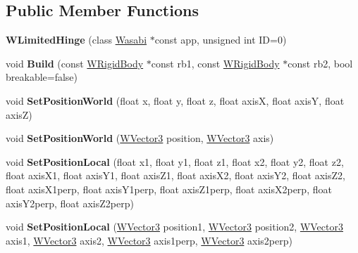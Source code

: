 \subsection*{Public Member Functions}
\begin{DoxyCompactItemize}
\item 
{\bfseries W\+Limited\+Hinge} (class \hyperlink{class_wasabi}{Wasabi} $\ast$const app, unsigned int ID=0)\hypertarget{class_w_limited_hinge_afb877862b34866ea9c5eb752d0b5ac76}{}\label{class_w_limited_hinge_afb877862b34866ea9c5eb752d0b5ac76}

\item 
void {\bfseries Build} (const \hyperlink{class_w_rigid_body}{W\+Rigid\+Body} $\ast$const rb1, const \hyperlink{class_w_rigid_body}{W\+Rigid\+Body} $\ast$const rb2, bool breakable=false)\hypertarget{class_w_limited_hinge_a1459654753eb6d47c1b88f49598e4edd}{}\label{class_w_limited_hinge_a1459654753eb6d47c1b88f49598e4edd}

\item 
void {\bfseries Set\+Position\+World} (float x, float y, float z, float axisX, float axisY, float axisZ)\hypertarget{class_w_limited_hinge_a236904087d888f79a180456560c1fd1d}{}\label{class_w_limited_hinge_a236904087d888f79a180456560c1fd1d}

\item 
void {\bfseries Set\+Position\+World} (\hyperlink{class_w_vector3}{W\+Vector3} position, \hyperlink{class_w_vector3}{W\+Vector3} axis)\hypertarget{class_w_limited_hinge_a7281548f7929429985999207b10f2bf5}{}\label{class_w_limited_hinge_a7281548f7929429985999207b10f2bf5}

\item 
void {\bfseries Set\+Position\+Local} (float x1, float y1, float z1, float x2, float y2, float z2, float axis\+X1, float axis\+Y1, float axis\+Z1, float axis\+X2, float axis\+Y2, float axis\+Z2, float axis\+X1perp, float axis\+Y1perp, float axis\+Z1perp, float axis\+X2perp, float axis\+Y2perp, float axis\+Z2perp)\hypertarget{class_w_limited_hinge_ab99476cc864800f8cce746a31576296f}{}\label{class_w_limited_hinge_ab99476cc864800f8cce746a31576296f}

\item 
void {\bfseries Set\+Position\+Local} (\hyperlink{class_w_vector3}{W\+Vector3} position1, \hyperlink{class_w_vector3}{W\+Vector3} position2, \hyperlink{class_w_vector3}{W\+Vector3} axis1, \hyperlink{class_w_vector3}{W\+Vector3} axis2, \hyperlink{class_w_vector3}{W\+Vector3} axis1perp, \hyperlink{class_w_vector3}{W\+Vector3} axis2perp)\hypertarget{class_w_limited_hinge_a28c5c36b031cab8ce38c920ab73c04e3}{}\label{class_w_limited_hinge_a28c5c36b031cab8ce38c920ab73c04e3}


\end{DoxyCompactItemize}
